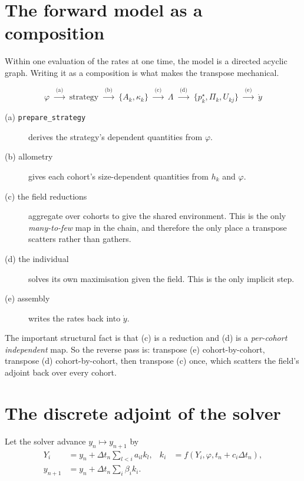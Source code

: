 \documentclass[11pt,a4paper]{article}
\newcommand{\code}[1]{\texttt{\small #1}}
\begin{document}
\section{The forward model as a composition}
\label{sec:forward}

Within one evaluation of the rates at one time, the model is a directed acyclic
graph. Writing it as a composition is what makes the transpose mechanical.

\begin{equation}
\varphi
\;\xrightarrow{\;\text{(a)}\;}\;
\text{strategy}
\;\xrightarrow{\;\text{(b)}\;}\;
\{A_k, \kappa_k\}
\;\xrightarrow{\;\text{(c)}\;}\;
\Lambda
\;\xrightarrow{\;\text{(d)}\;}\;
\{p^\star_k, \Pi_k, U_{kj}\}
\;\xrightarrow{\;\text{(e)}\;}\;
\dot y
\label{eq:composition}
\end{equation}

\begin{description}
\item[(a) \code{prepare\_strategy}] derives the strategy's dependent quantities
  from $\varphi$.
\item[(b) allometry] gives each cohort's size-dependent quantities from $h_k$ and
  $\varphi$.
\item[(c) the field reductions] aggregate over cohorts to give the shared
  environment. This is the only \emph{many-to-few} map in the chain, and therefore
  the only place a transpose scatters rather than gathers.
\item[(d) the individual] solves its own maximisation given the field. This is the
  only implicit step.
\item[(e) assembly] writes the rates back into $\dot y$.
\end{description}

The important structural fact is that (c) is a reduction and (d) is a
\emph{per-cohort independent} map. So the reverse pass is: transpose (e)
cohort-by-cohort, transpose (d) cohort-by-cohort, then transpose (c) once, which
scatters the field's adjoint back over every cohort.

\section{The discrete adjoint of the solver}
\label{sec:solver}

Let the solver advance $y_n \mapsto y_{n+1}$ by
\begin{align}
Y_i &= y_n + \Delta t_n \sum_{l<i} a_{il} k_l,
&
k_i &= f(Y_i, \varphi, t_n + c_i \Delta t_n),
\\
y_{n+1} &= y_n + \Delta t_n \sum_i \beta_i k_i .
\end{align}
\end{document}

